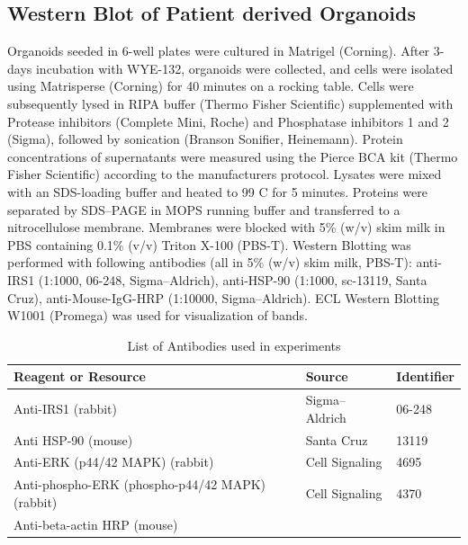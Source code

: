 \begin{flushleft}
\subsection{Western Blot of Patient derived Organoids}
Organoids seeded in 6-well plates were cultured in Matrigel (Corning). After 3-days incubation with WYE-132, organoids were collected, and cells were isolated using Matrisperse (Corning) for 40 minutes on a rocking table. Cells were subsequently lysed in RIPA buffer (Thermo Fisher Scientific) supplemented with Protease inhibitors (Complete Mini, Roche) and Phosphatase inhibitors 1 and 2 (Sigma), followed by sonication (Branson Sonifier, Heinemann). Protein concentrations of supernatants were measured using the Pierce BCA kit (Thermo Fisher Scientific) according to the manufacturers protocol. Lysates were mixed with an SDS-loading buffer and heated to 99 C for 5 minutes. Proteins were separated by SDS–PAGE in MOPS running buffer and transferred to a nitrocellulose membrane. Membranes were blocked with 5\% (w/v) skim milk in PBS containing 0.1\% (v/v) Triton X-100 (PBS-T). Western Blotting was performed with following antibodies (all in 5\% (w/v) skim milk, PBS-T): anti-IRS1 (1:1000, 06-248, Sigma–Aldrich), anti-HSP-90 (1:1000, sc-13119, Santa Cruz), anti-Mouse-IgG-HRP (1:10000, Sigma–Aldrich). ECL Western Blotting W1001 (Promega) was used for visualization of bands.

\begin{table}[htb]
\caption{List of Antibodies used in experiments}
\label{tab:antibodies} %
\begin{tabularx}{\textwidth}{Xll}
\toprule
\textbf{Reagent or Resource} & \textbf{Source} & \textbf{Identifier} \\
\midrule
Anti-IRS1 (rabbit) & Sigma–Aldrich & 06-248 \\
Anti HSP-90 (mouse) & Santa Cruz & 13119 \\
Anti-ERK (p44/42 MAPK) (rabbit) & Cell Signaling & 4695 \\
Anti-phospho-ERK (phospho-p44/42 MAPK) (rabbit) & Cell Signaling & 4370 \\
Anti-beta-actin HRP (mouse) &  &  \\
\bottomrule
\end{tabularx}
\end{table}


\end{flushleft}
